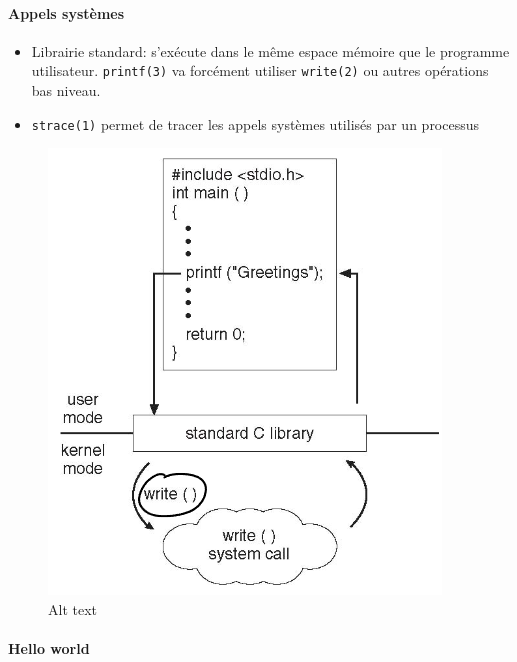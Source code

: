 \paragraph{Appels systèmes}\label{appels-systuxe8mes}

\begin{itemize}
\tightlist
\item
  Librairie standard: s'exécute dans le même espace mémoire que le
  programme utilisateur. \texttt{printf(3)} va forcément utiliser
  \texttt{write(2)} ou autres opérations bas niveau.
\item
  \texttt{strace(1)} permet de tracer les appels systèmes utilisés par
  un processus
\end{itemize}

\begin{figure}
\centering
\includegraphics{image-14.png}
\caption{Alt text}
\end{figure}

\paragraph{Hello world}\label{hello-world}

\begin{Shaded}
\begin{Highlighting}[]

\OperatorTok{(}\OperatorTok{,}  \OperatorTok{*}\OperatorTok{[])\{}
\OperatorTok{(}\OperatorTok{,}\OperatorTok{(}\OperatorTok{));}
   \OperatorTok{;}
\OperatorTok{\}}
\end{Highlighting}
\end{Shaded}

